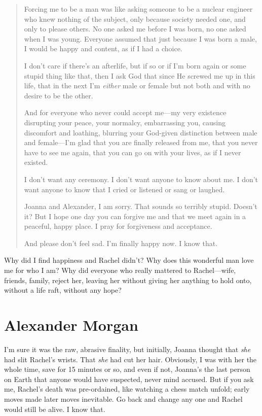 \begin{quote}
Forcing me to be a man was like asking someone to be a nuclear engineer
who knew nothing of the subject, only because society needed one, and
only to please others. No one asked me before I was born, no one asked
when I was young. Everyone assumed that just because I was born a male,
I would be happy and content, as if I had a choice.

I don't care if there's an afterlife, but if so or if I'm born again or
some stupid thing like that, then I ask God that since He screwed me up
in this life, that in the next I'm \emph{either} male or female but not
both and with no desire to be the other.

And for everyone who never could accept me---my very existence
disrupting your peace, your normalcy, embarrassing you, causing
discomfort and loathing, blurring your God-given distinction between
male and female---I'm glad that you are finally released from me, that
you never have to see me again, that you can go on with your lives, as
if I never existed.

I don't want any ceremony. I don't want anyone to know about me. I don't
want anyone to know that I cried or listened or sang or laughed.

Joanna and Alexander, I am sorry. That sounds so terribly stupid.
Doesn't it? But I hope one day you can forgive me and that we meet again
in a peaceful, happy place. I pray for forgiveness and acceptance.

And please don't feel sad. I'm finally happy now. I know that.
\end{quote}

\noindent Why did I find happiness and Rachel didn't? Why does this
wonderful man love me for who I am? Why did everyone who really mattered
to Rachel---wife, friends, family, reject her, leaving her without
giving her anything to hold onto, without a life raft, without any hope?

\chapter{Alexander Morgan}

\titlemark

I'm sure it was the raw, abrasive finality, but initially, Joanna
thought that \emph{she} had slit Rachel's wrists. That \emph{she} had
cut her hair. Obviously, I was with her the whole time, save for 15
minutes or so, and even if not, Joanna's the last person on Earth that
anyone would have suspected, never mind accused. But if you ask me,
Rachel's death was pre-ordained, like watching a chess match unfold;
early moves made later moves inevitable. Go back and change any one and
Rachel would still be alive. I know that.

